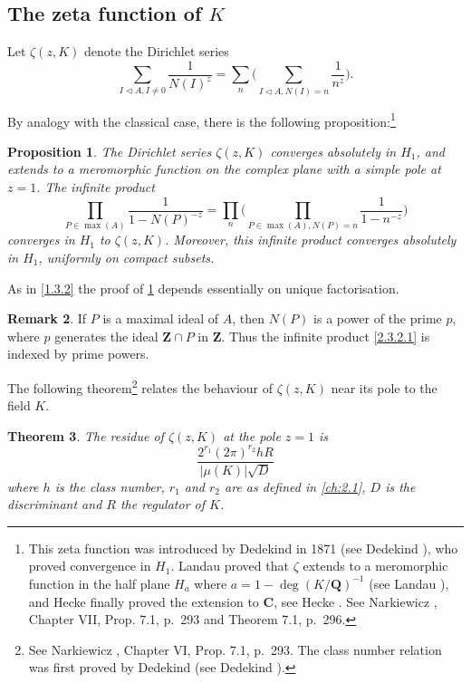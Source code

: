 \documentclass[10pt]{article}
\newtheorem{theo}{Theorem}[subsection]
\newtheorem{prop}[theo]{Proposition}
\theoremstyle{definition}
\newtheorem{rema}[theo]{Remark}
\def\ZZ{\mathbf{Z}}
\def\QQ{\mathbf{Q}}
\def\CC{\mathbf{C}}
\newcommand{\tri}{\mathbin{\triangleleft}}
\def\fnonse{This zeta function was introduced by Dedekind in 1871 (see Dedekind \cite{bib:37}), who proved convergence in $H_1$. Landau proved that $\zeta$ extends to a meromorphic function in the half plane $H_a$ where $a = 1 - \deg(K / \QQ)^{-1}$ (see Landau \cite{bib:116}), and Hecke finally proved the extension to $\CC$, see Hecke \cite{bib:94}. See Narkiewicz \cite{bib:146}, Chapter VII, Prop. 7.1, p.~293 and Theorem 7.1, p.~296.}
\def\fnonei{See Narkiewicz \cite{bib:146}, Chapter VI, Prop. 7.1, p.~293. The class number relation was first proved by Dedekind (see Dedekind \cite{bib:37}).}
\begin{document}
\subsection[The zeta function of K]{The zeta function of $K$}
\label{ch:2.3}

Let $\zeta(z,K)$ denote the Dirichlet series
\begin{equation}
\label{2.3.1}
\sum_{I \tri A, I\not=0} \frac{1}{N(I)^z}
= \sum_n \biggl(
\sum_{I \tri A, N(I)=n} \frac{1}{n^z}
\biggr).
\end{equation}

By analogy with the classical case, there is the following proposition:\footnote{\fnonse}


\begin{prop}
\label{2.3.2}
The Dirichlet series $\zeta(z,K)$ converges absolutely in $H_1$, and extends to a meromorphic function on the complex plane with a simple pole at $z = 1$.
The infinite product
\begin{equation}
\label{2.3.2.1}
\prod_{P \in \max(A)} \frac{1}{1 - N(P)^{-z}}
= \prod_n\biggl(
\prod_{P \in \max(A), N(P)=n} \frac{1}{1-n^{-z}}
\biggr)
\end{equation}
converges in $H_1$ to $\zeta(z,K)$.
Moreover, this infinite product converges absolutely in $H_1$, uniformly on compact subsets.
\end{prop}


As in \ref{1.3.2} the proof of \ref{2.3.2} depends essentially on unique factorisation.


\begin{rema}
\label{2.3.3}
If $P$ is a maximal ideal of $A$, then $N(P)$ is a power of the prime $p$, where $p$ generates the ideal $\ZZ \cap P$ in $\ZZ$.
Thus the infinite product \eqref{2.3.2.1} is indexed by prime powers.
\end{rema}

The following theorem\footnote{\fnonei} relates the behaviour of $\zeta(z,K)$ near its pole to the field $K$.


\begin{theo}
\label{2.3.4}
The residue of $\zeta(z,K)$ at the pole $z = 1$ is
\begin{equation}
\label{2.3.4.1}
\frac{2^{r_1} (2\pi)^{r_2} h R}{|\mu(K)| \sqrt D}
\end{equation}
where $h$ is the class number, $r_1$ and $r_2$ are as defined in \ref{ch:2.1}, $D$ is the discriminant and $R$ the regulator of $K$.
\end{theo}
\end{document}
